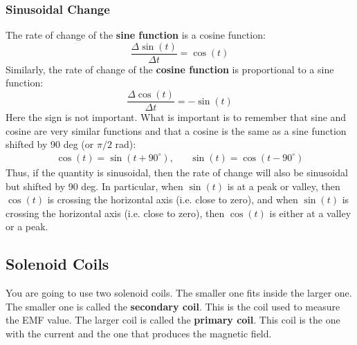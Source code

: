 \subsubsection{Sinusoidal Change}
%
The rate of change of the \textbf{sine function} is a cosine function:
\begin{equation}
	\frac{\Delta \sin(t)}{\Delta t} = \cos(t)
\end{equation}
Similarly, the rate of change of the \textbf{cosine function} is proportional to a sine function:
\begin{equation}
	\frac{\Delta \cos(t)}{\Delta t} = -\sin(t)
\end{equation}
Here the sign is not important. What is important is to remember that sine and cosine are very similar functions and that a cosine is the same as a sine function shifted by 90 deg (or $\pi/2$ rad):
\begin{align}
	\cos(t) = \sin(t + 90^{\circ}), && \sin(t) = \cos(t - 90^{\circ})
\end{align}
Thus, if the quantity is sinusoidal, then the rate of change will also be sinusoidal but shifted by 90 deg. In particular, when $\sin(t)$ is at a peak or valley, then $\cos(t)$ is crossing the horizontal axis (i.e. close to zero), and when $\sin(t)$ is crossing the horizontal axis (i.e. close to zero), then $\cos(t)$ is either at a valley or a peak.
%
\subsection{Solenoid Coils}
%
You are going to use two solenoid coils. The smaller one fits inside the larger one. The smaller one is called the \textbf{secondary coil}. This is the coil used to measure the EMF value. The larger coil is called the \textbf{primary coil}. This coil is the one with the current and the one that produces the magnetic field.

